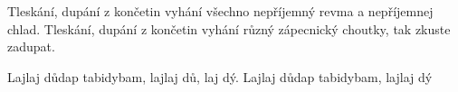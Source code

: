 \beginverse{}
\chordsoff{}
Tleskání, dupání z končetin vyhání
všechno nepříjemný revma a nepříjemnej chlad.
Tleskání, dupání z končetin vyhání
různý zápecnický choutky, tak zkuste zadupat.
\chordson{}
\endverse{}

\repeatingchorus{}
\beginchorus{}
\chordsoff{}
\lrep{} Lajlaj důdap tabidybam, lajlaj dů, laj dý.
Lajlaj důdap tabidybam, lajlaj dý \rrep{}
\chordson{}
\endchorus{}

\endsong{}
